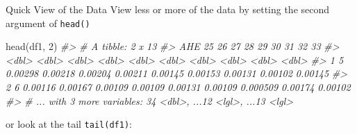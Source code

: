 \documentclass[
  11pt,
  ignorenonframetext,
  svgnames, handout, t]{beamer}
\newenvironment{Shaded}{\begin{snugshade}}{\end{snugshade}}
\newcommand{\CommentTok}[1]{\textcolor[rgb]{0.56,0.35,0.01}{\textit{#1}}}
\newcommand{\DecValTok}[1]{\textcolor[rgb]{0.00,0.00,0.81}{#1}}
\newcommand{\FunctionTok}[1]{\textcolor[rgb]{0.00,0.00,0.00}{#1}}
\newcommand{\NormalTok}[1]{#1}
\begin{document}
\begin{frame}[fragile]{Quick View of the Data}
\protect\hypertarget{quick-view-of-the-data-1}{}
View less or more of the data by setting the second argument of
\texttt{head()}

\footnotesize

\begin{Shaded}
\begin{Highlighting}[]
\FunctionTok{head}\NormalTok{(df1, }\DecValTok{2}\NormalTok{)}
\CommentTok{\#\textgreater{} \# A tibble: 2 x 13}
\CommentTok{\#\textgreater{}     AHE    \textasciigrave{}25\textasciigrave{}    \textasciigrave{}26\textasciigrave{}    \textasciigrave{}27\textasciigrave{}    \textasciigrave{}28\textasciigrave{}    \textasciigrave{}29\textasciigrave{}    \textasciigrave{}30\textasciigrave{}     \textasciigrave{}31\textasciigrave{}    \textasciigrave{}32\textasciigrave{}    \textasciigrave{}33\textasciigrave{}}
\CommentTok{\#\textgreater{}   \textless{}dbl\textgreater{}   \textless{}dbl\textgreater{}   \textless{}dbl\textgreater{}   \textless{}dbl\textgreater{}   \textless{}dbl\textgreater{}   \textless{}dbl\textgreater{}   \textless{}dbl\textgreater{}    \textless{}dbl\textgreater{}   \textless{}dbl\textgreater{}   \textless{}dbl\textgreater{}}
\CommentTok{\#\textgreater{} 1     5 0.00298 0.00218 0.00204 0.00211 0.00145 0.00153 0.00131  0.00102 0.00145}
\CommentTok{\#\textgreater{} 2     6 0.00116 0.00167 0.00109 0.00109 0.00131 0.00109 0.000509 0.00174 0.00102}
\CommentTok{\#\textgreater{} \# ... with 3 more variables: \textasciigrave{}34\textasciigrave{} \textless{}dbl\textgreater{}, ...12 \textless{}lgl\textgreater{}, ...13 \textless{}lgl\textgreater{}}
\end{Highlighting}
\end{Shaded}

\normalsize

or look at the tail \texttt{tail(df1)}:

\footnotesize


\end{frame}
\end{document}
